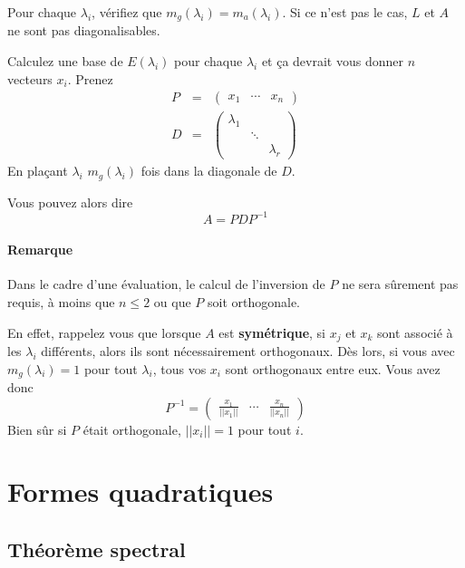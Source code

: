 \documentclass[11pt,a4paper]{article}
\theoremstyle{definition}
\begin{document}
Pour chaque $\lambda_i$, vérifiez que $m_g(\lambda_i) = m_a(\lambda_i)$. Si ce n'est pas le cas, $L$ et $A$ ne sont pas diagonalisables.

Calculez une base de $E(\lambda_i)$ pour chaque $\lambda_i$ et ça devrait vous donner $n$ vecteurs $x_i$.
Prenez
\begin{eqnarray*}
	P &=& \begin{pmatrix}x_1 & \cdots & x_n\end{pmatrix}\\
	D &=&
	\begin{pmatrix}
		\lambda_1 & &\\
		&\ddots&\\
		&&\lambda_r
	\end{pmatrix}
\end{eqnarray*}
En plaçant $\lambda_i$ $m_g(\lambda_i)$ fois dans la diagonale de $D$.

Vous pouvez alors dire
\[ A = PDP^{-1} \]

\paragraph{Remarque}
Dans le cadre d'une évaluation, le calcul de l'inversion de $P$ ne sera sûrement pas requis, à moins que $n \leq 2$ ou que $P$ soit orthogonale.

En effet, rappelez vous que lorsque $A$ est \textbf{symétrique}, si $x_j$ et $x_k$ sont associé à les $\lambda_i$ différents, alors ils sont nécessairement orthogonaux.
Dès lors, si vous avec $m_g(\lambda_i) = 1$ pour tout $\lambda_i$, tous vos $x_i$ sont orthogonaux entre eux.
Vous avez donc
\[
P^{-1} =
\begin{pmatrix}
	\frac{x_1}{||x_1||} & \cdots & \frac{x_n}{||x_n||}
\end{pmatrix}
\]
Bien sûr si $P$ était orthogonale, $||x_i|| = 1$ pour tout $i$.


\section{Formes quadratiques}

\subsection{Théorème spectral}
\end{document}
